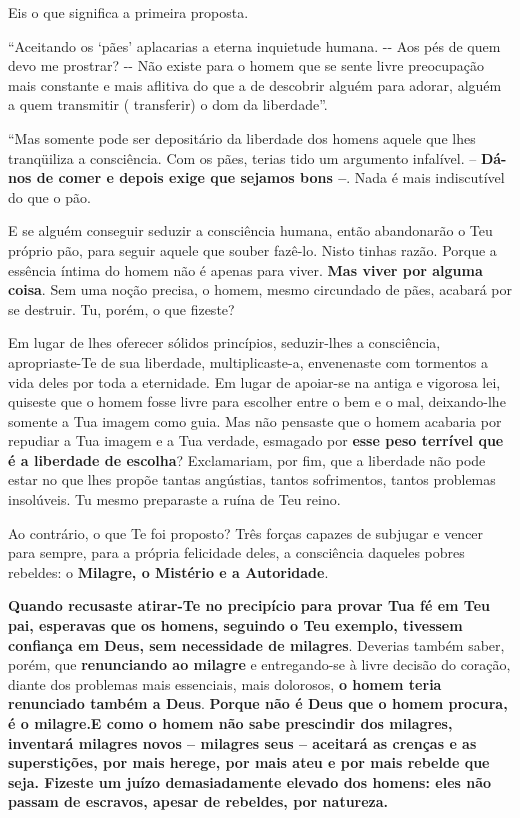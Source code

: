 Eis o que significa a primeira proposta.

``Aceitando os `pães' aplacarias a eterna inquietude humana. -\/- Aos
pés de quem devo me prostrar? -\/- Não existe para o homem que se sente
livre preocupação mais constante e mais aflitiva do que a de descobrir
alguém para adorar, alguém a quem transmitir ( transferir) o dom da
liberdade''.

``Mas somente pode ser depositário da liberdade dos homens aquele que
lhes tranqüiliza a consciência. Com os pães, terias tido um argumento
infalível. -- \textbf{Dá-nos de comer e depois exige que sejamos bons
--}. Nada é mais indiscutível do que o pão.

E se alguém conseguir seduzir a consciência humana, então abandonarão o
Teu próprio pão, para seguir aquele que souber fazê-lo. Nisto tinhas
razão. Porque a essência íntima do homem não é apenas para viver.
\textbf{Mas viver por alguma coisa}. Sem uma noção precisa, o homem,
mesmo circundado de pães, acabará por se destruir. Tu, porém, o que
fizeste?

Em lugar de lhes oferecer sólidos princípios, seduzir-lhes a
consciência, apropriaste-Te de sua liberdade, multiplicaste-a,
envenenaste com tormentos a vida deles por toda a eternidade. Em lugar
de apoiar-se na antiga e vigorosa lei, quiseste que o homem fosse livre
para escolher entre o bem e o mal, deixando-lhe somente a Tua imagem
como guia. Mas não pensaste que o homem acabaria por repudiar a Tua
imagem e a Tua verdade, esmagado por \textbf{esse peso terrível que é a
liberdade de escolha}? Exclamariam, por fim, que a liberdade não pode
estar no que lhes propõe tantas angústias, tantos sofrimentos, tantos
problemas insolúveis. Tu mesmo preparaste a ruína de Teu reino.

Ao contrário, o que Te foi proposto? Três forças capazes de subjugar e
vencer para sempre, para a própria felicidade deles, a consciência
daqueles pobres rebeldes: o \textbf{Milagre, o Mistério e a Autoridade}.

\textbf{Quando recusaste atirar-Te no precipício para provar Tua fé em
Teu pai, esperavas que os homens, seguindo o Teu exemplo, tivessem
confiança em Deus, sem necessidade de milagres}. Deverias também saber,
porém, que \textbf{renunciando ao milagre} e entregando-se à livre
decisão do coração, diante dos problemas mais essenciais, mais
dolorosos, \textbf{o homem teria renunciado também a Deus}.
\textbf{Porque não é Deus que o homem procura, é o milagre.E como o
homem não sabe prescindir dos milagres, inventará milagres novos --
milagres seus -- aceitará as crenças e as superstições, por mais herege,
por mais ateu e por mais rebelde que seja. Fizeste um juízo
demasiadamente elevado dos homens: eles não passam de escravos, apesar
de rebeldes, por natureza.}

